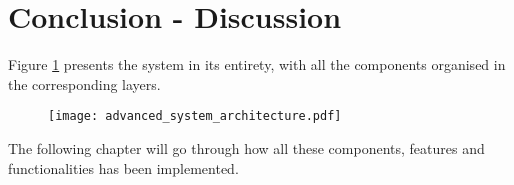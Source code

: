 \section{Conclusion - Discussion}

Figure \ref{fig:advanced_system} presents the system in its entirety,
with all the components organised in the corresponding layers.

\begin{figure}[H]
\centering
\texttt{[image: advanced\_system\_architecture.pdf]}
\label{fig:advanced_system}
\end{figure}

The following chapter will go through how all these components,
features and functionalities has been implemented.